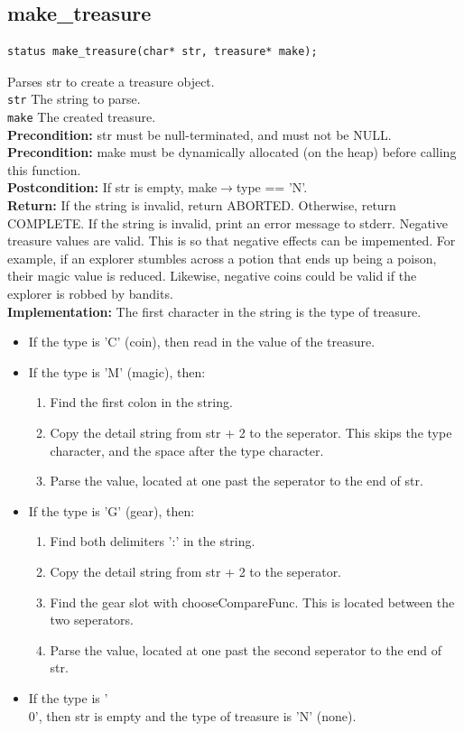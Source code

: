 \documentclass{article}
\begin{document}
\subsection{make\_treasure}
\begin{lstlisting}
status make_treasure(char* str, treasure* make);
\end{lstlisting}


  Parses  str to create a treasure object.\\ 
 \texttt{str} The string to parse.\\ 
 \texttt{make} The created treasure.\\ 
 \textbf{Precondition:}  str must be null-terminated, and must not be NULL.\\ 
 \textbf{Precondition:}  make must be dynamically allocated (on the heap) before calling this function.\\ 
 \textbf{Postcondition:} If  str is empty,  make$\rightarrow$type == 'N'.\\ 
 \textbf{Return:} If the string is invalid, return ABORTED.
     Otherwise, return COMPLETE.
  If the string is invalid, print an error message to stderr.
     Negative treasure values are valid. This is so that negative effects can be impemented.
     For example, if an explorer stumbles across a potion that ends up being a poison,
     their magic value is reduced. Likewise, negative coins could be valid if the explorer
     is robbed by bandits.\\ 
 
 
 \textbf{Implementation:}
The first character in the string is the type of  treasure.
\begin{itemize}
\item If the type is 'C' (coin), then read in the value of the treasure.
\item If the type is 'M' (magic), then:
\begin{enumerate}
     \item Find the first colon in the string.
     \item Copy the detail string from  str + 2 to the seperator.
         This skips the type character, and the space after the type character.
     \item Parse the value, located at one past the seperator to the end of  str.
\end{enumerate}
\item If the type is 'G' (gear), then:
\begin{enumerate}
     \item Find both delimiters ':' in the string.
     \item Copy the detail string from  str + 2 to the seperator.
     \item Find the gear slot with  chooseCompareFunc. This is located between the two seperators.
     \item Parse the value, located at one past the second seperator to the end of  str.
\end{enumerate}
\item If the type is '\\0', then  str is empty and the type of treasure is 'N' (none).
\end{itemize}
\end{document}
